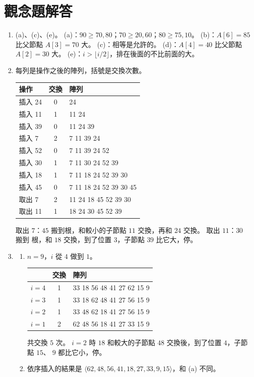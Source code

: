 \section*{觀念題解答}

\begin{enumerate}
\item (a)、(c)、(e)。 (a)：$90 \ge 70, 80$；$70 \ge 20, 60$；$80 \ge 75, 10$。 (b)：$A[6] =
85$ 比父節點 $A[3] = 70$ 大。 (c)：相等是允許的。 (d)：$A[4] = 40$ 比父節點 $A[2] = 30$
大。 (e)：$i > \lfloor i/2 \rfloor$，排在後面的不比前面的大。

\item 每列是操作之後的陣列，括號是交換次數。
\begin{center}
\begin{tabular}{lcl}
\toprule
操作 & 交換 & 陣列 \\
\midrule
插入 24 & 0 & 24 \\
插入 11 & 1 & 11 24 \\
插入 39 & 0 & 11 24 39 \\
插入 7 & 2 & 7 11 39 24 \\
插入 52 & 0 & 7 11 39 24 52 \\
插入 30 & 1 & 7 11 30 24 52 39 \\
插入 18 & 1 & 7 11 18 24 52 39 30 \\
插入 45 & 0 & 7 11 18 24 52 39 30 45 \\
取出 7 & 2 & 11 24 18 45 52 39 30 \\
取出 11 & 1 & 18 24 30 45 52 39 \\
\bottomrule
\end{tabular}
\end{center}
取出 $7$：$45$ 搬到根，和較小的子節點 $11$ 交換，再和 $24$ 交換。 取出 $11$：$30$ 搬到
根，和 $18$ 交換，到了位置 $3$，子節點 $39$ 比它大，停。

\item
\begin{enumerate}
\item $n = 9$，$i$ 從 $4$ 做到 $1$。
\begin{center}
\begin{tabular}{lcl}
\toprule
& 交換 & 陣列 \\
\midrule
$i = 4$ & 1 & 33 18 56 48 41 27 62 15 9 \\
$i = 3$ & 1 & 33 18 62 48 41 27 56 15 9 \\
$i = 2$ & 1 & 33 48 62 18 41 27 56 15 9 \\
$i = 1$ & 2 & 62 48 56 18 41 27 33 15 9 \\
\bottomrule
\end{tabular}
\end{center}
共交換 $5$ 次。 $i = 2$ 時 $18$ 和較大的子節點 $48$ 交換後，到了位置 $4$，子節點 $15$、
$9$ 都比它小，停。
\item 依序插入的結果是 $\langle 62, 48, 56, 41, 18, 27, 33, 9, 15 \rangle$，和 (a) 不同。
\end{enumerate}


\end{enumerate}
